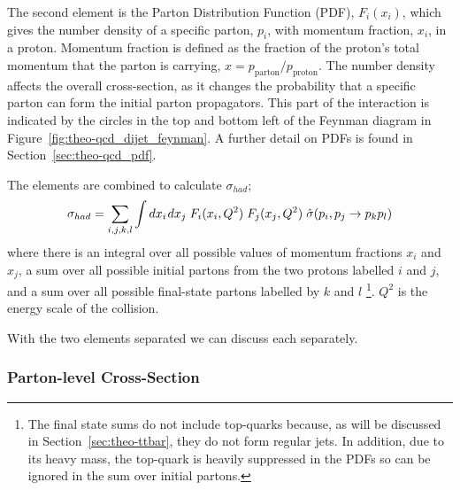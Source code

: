 The second element is the Parton Distribution Function (PDF), $F_i(x_i)$, which gives the number density of
a specific parton, $p_i$, with momentum fraction, $x_i$, in a proton.
Momentum fraction is defined as the fraction of the proton's total momentum that the parton is carrying, $x = p_{\text{parton}}/p_{\text{proton}}$.
The number density affects the overall cross-section, as it changes the probability that a specific parton
can form the initial parton propagators.
This part of the interaction is indicated by the circles in the
top and bottom left of the Feynman diagram in Figure~\ref{fig:theo-qcd_dijet_feynman}.
A further detail on PDFs is found in Section~\ref{sec:theo-qcd_pdf}.

The elements are combined to calculate $\sigma_{had}$;
\begin{equation}
  \sigma_{had} = \sum_{i,j,k,l} \int dx_i\hspace{0.3mm} dx_j \hspace{1mm} F_i(x_i,Q^2)\hspace{1mm}F_j(x_j,Q^2)\hspace{1mm}\hat{\sigma}(p_i, p_j\to p_k p_l)
\end{equation}
where there is an integral over all possible values of momentum fractions $x_i$ and $x_j$,
a sum over all possible initial partons from the two protons labelled $i$ and $j$,
and a sum over all possible final-state partons labelled by $k$ and $l$
\footnote{The final state sums do not include top-quarks because, as will be discussed in Section~\ref{sec:theo-ttbar}, they do not form regular jets. 
  In addition, due to its heavy mass, the top-quark is heavily suppressed in the PDFs so can be ignored in the sum over initial partons.}.
$Q^2$ is the energy scale of the collision.

\noindent
With the two elements separated we can discuss each separately.

\subsubsection{Parton-level Cross-Section}
\label{sec:theo-qcd_dijet_xs}

